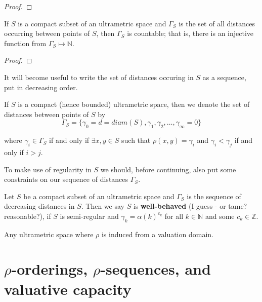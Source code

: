 \begin{proof}
\end{proof}

\begin{corollary}
\cite{ar} If $S$ is a compact subset of an ultrametric space and $\Gamma_S$ is the set of all distances occurring between points of $S$, then $\Gamma_S$ is countable; that is, there is an injective function from $\Gamma_S \mapsto \mathbb{N}$.
\end{corollary}

\begin{proof}
\end{proof}

It will become useful to write the set of distances occuring in $S$ as a sequence, put in decreasing order. 

\begin{notation*}
If $S$ is a compact (hence bounded) ultrametric space, then we denote the set of distances between points of $S$ by 
$$\Gamma_S = \{\gamma_0 = d =diam(S), \gamma_1, \gamma_2, \ldots, \gamma_\infty =0 \}$$

where $\gamma_i \in  \Gamma_S$ if and only if $\exists x,y \in S$ such that $\rho(x,y) = \gamma_i$ and  $\gamma_i < \gamma_j$ if and only if $i > j$. 
\end{notation*}


To make use of regularity in $S$ we should, before continuing, also put some constraints on our sequence of distances $\Gamma_S$.

\begin{definition}
Let $S$ be a compact subset of an ultrametric space and $\Gamma_S$ is the sequence of decreasing distances in $S$. Then we say $S$ is \textbf{well-behaved} (I guess - or tame? reasonable?), if $S$ is semi-regular and $\gamma_k = \alpha(k)^{c_k}$ for all $k \in \mathbb{N}$ and some $c_k \in \mathbb{Z}$.
\end{definition}

\begin{example}
Any ultrametric space where $\rho$ is induced from a valuation domain.
\end{example}



\newpage
\section*{$\rho$-orderings, $\rho$-sequences, and valuative capacity}


